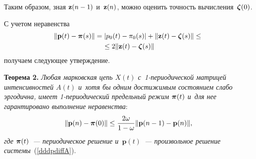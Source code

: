 \begin{multicols}{2}
Таким образом, зная ${\mathbf z}(n-1)$ и~${\mathbf z}(n)$, можно оценить точность
вычисления~$\boldsymbol{\zeta}(0)$.

\pagebreak

С учетом неравенства
\begin{multline*}
\|\mathbf{p}(t)-{\boldsymbol{\pi}}(s)\|=|p_0(t)-\pi_0(s)|+\|{\mathbf z}(t)-
\boldsymbol{\zeta}(s)\|\le{}\\
{}\le
2\|{\mathbf z}(t)-\boldsymbol{\zeta}(s)\|
\end{multline*}
получаем следующее утверждение.

\smallskip

\noindent
\textbf{Теорема 2.}
 \textit{Любая марковская цепь $X(t)$ с~1-пе\-рио\-ди\-че\-ской матрицей 
интенсивностей $A(t)$ и~хотя бы одним достижимым состоянием слабо 
эргодична,
 имеет 1-периодический предельный режим $\boldsymbol{\pi}(t)$ и~для нее 
гарантировано выполнение неравенства}:
\begin{equation*}
\|\mathbf{p}(n)-\boldsymbol{\pi}(0)\|\le \displaystyle\frac{\displaystyle 2\omega\mathstrut}{\displaystyle 1-\omega\mathstrut}\|\mathbf{p}(n-1)-
\mathbf{p}(n)\|,
\end{equation*}
\textit{где $\boldsymbol{\pi}(t)$~--- периодическое решение и~$\mathbf{p}(t)$~--- 
произвольное решение
системы}~(\ref{dddpdiffA}).



\end{multicols}
